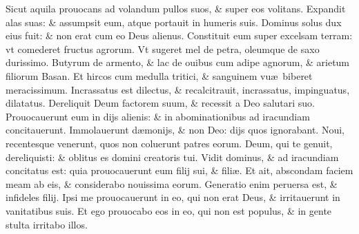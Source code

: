 \documentclass[a5paper,10pt]{book}
\def\ae{æ}
\begin{document}
\begin{multicols*}{2}
\newline \color{red} S\color{black}icut aquila prouocans ad volandum pullos suos, \& super eos volitans.
\newline \color{red} E\color{black}xpandit alas suas: \& assumpsit eum, atque portauit in humeris suis.
\newline \color{red} D\color{black}ominus solus dux eius fuit: \& non erat cum eo Deus alienus.
\newline \color{red} C\color{black}onstituit eum super excelsam terram: vt comederet fructus agrorum.
\newline \color{red} V\color{black}t sugeret mel de petra, oleumque de saxo durissimo.
\newline \color{red} B\color{black}utyrum de armento, \& lac de ouibus cum adipe agnorum, \& arietum filiorum Basan.
\newline \color{red} E\color{black}t hircos cum medulla tritici, \& sanguinem vu\ae \ biberet meracissimum.
\newline \color{red} I\color{black}ncrassatus est dilectus, \& recalcitrauit, incrassatus, impinguatus, dilatatus.
\newline \color{red} D\color{black}ereliquit Deum factorem suum, \& recessit a Deo salutari suo.
\newline \color{red} P\color{black}rouocauerunt eum in dijs alienis: \& in abominationibus ad iracundiam concitauerunt.
\newline \color{red} I\color{black}mmolauerunt d\ae monijs, \& non Deo: dijs quos ignorabant.
\newline \color{red} N\color{black}oui, recentesque venerunt, quos non coluerunt patres eorum.
\newline \color{red} D\color{black}eum, qui te genuit, dereliquisti: \& oblitus es domini creatoris tui.
\newline \color{red} V\color{black}idit dominus, \& ad iracundiam concitatus est: quia prouocauerunt eum filij sui, \& fili\ae .
\newline \color{red} E\color{black}t ait, abscondam faciem meam ab eis, \& considerabo nouissima eorum.
\newline \color{red} G\color{black}eneratio enim peruersa est, \& infideles filij.
\newline \color{red} I\color{black}psi me prouocauerunt in eo, qui non erat Deus, \& irritauerunt in vanitatibus suis.
\newline \color{red} E\color{black}t ego prouocabo eos in eo, qui non est populus, \& in gente stulta irritabo illos.

\end{multicols*}
\end{document}
